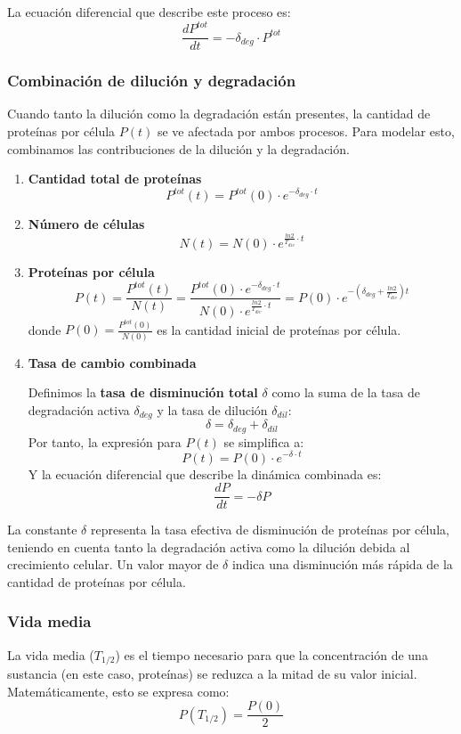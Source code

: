 La ecuación diferencial que describe este proceso es:
$$ \frac{dP^{tot}}{dt} = -\delta_{deg} \cdot P^{tot}$$

\subsubsection{Combinación de dilución y degradación}
Cuando tanto la dilución como la degradación están presentes, la cantidad de proteínas por célula $P(t)$ se ve afectada por ambos procesos. Para modelar esto, combinamos las contribuciones de la dilución y la degradación.
\begin{enumerate}
\item \textbf{Cantidad total de proteínas}
$$P^{tot}(t) = P^{tot}(0) \cdot e^{-\delta_{deg} \cdot t}$$

\item \textbf{Número de células}
$$N(t) = N(0) \cdot e^{\frac{ln 2}{T_{div}} \cdot t}$$

\item \textbf{Proteínas por célula}
$$P(t) = \frac{P^{tot} (t)}{N(t)} = \frac{P^{tot}(0) \cdot e^{-\delta_{deg} \cdot t}}{N(0) \cdot e^{\frac{ln 2}{T_{div}} \cdot t}} = P(0) \cdot e^{-(\delta_{deg} + \frac{ln2}{T_{div}})t}$$
donde $P(0) = \frac{P^{tot}(0)}{N(0)}$ es la cantidad inicial de proteínas por célula.

\item \textbf{Tasa de cambio combinada}

Definimos la \textbf{tasa de disminución total} $\delta$ como la suma de la tasa de degradación activa $\delta_{deg}$ y la tasa de dilución $\delta_{dil}$:
$$\delta = \delta_{deg} + \delta_{dil}$$
Por tanto, la expresión para $P(t)$ se simplifica a:
$$P(t) = P(0) \cdot e^{-\delta \cdot t}$$
Y la ecuación diferencial que describe la dinámica combinada es:
$$\frac{dP}{dt} = -\delta P$$
\end{enumerate}

La constante $\delta$ representa la tasa efectiva de disminución de proteínas por célula, teniendo en cuenta tanto la degradación activa como la dilución debida al crecimiento celular. Un valor mayor de $\delta$ indica una disminución más rápida de la cantidad de proteínas por célula.

\subsubsection{Vida media}
La vida media ($T_{1/2}$) es el tiempo necesario para que la concentración de una sustancia (en este caso, proteínas) se reduzca a la mitad de su valor inicial. Matemáticamente, esto se expresa como:
$$P(T_{1/2}) = \frac{P(0)}{2}$$

